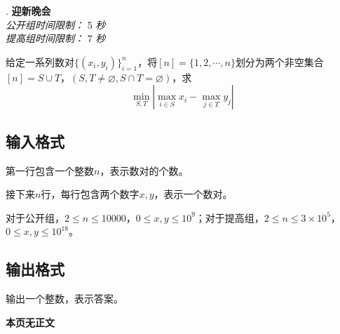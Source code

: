 \addtocounter{ProblemNo}{1}
\renewcommand{\ProblemName}{迎新晚会}
\begin{center}
\huge{. \textbf{\ProblemName}} \\ [0.8cm]
\large{\textit{公开组时间限制：} 5 \textit{秒}} \\ 
\large{\textit{提高组时间限制：} 7 \textit{秒}} \\ [1cm]
\end{center}

给定一系列数对$\{(x_i, y_i)\}_{i=1}^{n}$，将$[n] = \{1, 2, \cdots, n\}$划分为两个非空集合$[n] = S \cup T$，$(S, T \neq \varnothing, S \cap T = \varnothing)$，求
$$
\min_{S, T} | \max_{i \in S} x_i - \max_{j \in T} y_j |
$$

\subsection*{输入格式}

第一行包含一个整数$n$，表示数对的个数。

接下来$n$行，每行包含两个数字$x, y$，表示一个数对。

对于公开组，$2 \leq n \leq 10000$，$0 \leq x, y \leq 10^9$；对于提高组，$2 \leq n \leq 3 \times 10^5$，$0 \leq x, y \leq 10^{18}$。

\subsection*{输出格式}

输出一个整数，表示答案。

\setcounter{ExampleNo}{0}


\clearpage

\ifodd\value{page}
\else
    \vspace*{\fill}
    \begin{center}
    \textbf{\Large 本页无正文}
    \end{center}
    \vspace*{\fill}
    \clearpage
\fi


